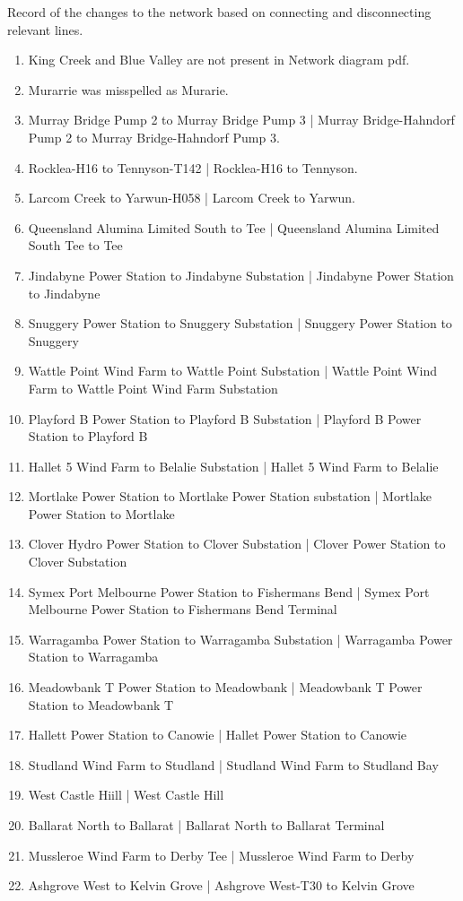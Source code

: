\documentclass{article}
\begin{document}
Record of the changes to the network based on connecting and disconnecting relevant lines.
\begin{enumerate}
\item King Creek and Blue Valley are not present in Network diagram pdf.
\item Murarrie was misspelled as Murarie.
\item Murray Bridge Pump 2 to Murray Bridge Pump 3 | Murray Bridge-Hahndorf Pump 2 to Murray Bridge-Hahndorf Pump 3.
\item Rocklea-H16 to Tennyson-T142 | Rocklea-H16 to Tennyson.
\item Larcom Creek to Yarwun-H058 | Larcom Creek to Yarwun.
\item Queensland Alumina Limited South to Tee | Queensland Alumina Limited South Tee to Tee
\item Jindabyne Power Station to Jindabyne Substation | Jindabyne Power Station to Jindabyne
\item Snuggery Power Station to Snuggery Substation | Snuggery Power Station to Snuggery 
\item Wattle Point Wind Farm to Wattle Point Substation | Wattle Point Wind Farm to Wattle Point Wind Farm Substation
\item Playford B Power Station to Playford B Substation | Playford B Power Station to Playford B
\item Hallet 5 Wind Farm to Belalie Substation | Hallet 5 Wind Farm to Belalie
\item Mortlake Power Station to Mortlake Power Station substation | Mortlake Power Station to Mortlake
\item Clover Hydro Power Station to Clover Substation | Clover Power Station to Clover Substation
\item Symex Port Melbourne Power Station to Fishermans Bend | Symex Port Melbourne Power Station to Fishermans Bend Terminal
\item Warragamba Power Station to Warragamba Substation | Warragamba Power Station to Warragamba
\item Meadowbank T Power Station to Meadowbank | Meadowbank T Power Station to Meadowbank T
\item Hallett Power Station to Canowie | Hallet Power Station to Canowie
\item Studland Wind Farm to Studland | Studland Wind Farm to Studland Bay
\item West Castle Hiill | West Castle Hill
\item Ballarat North to Ballarat | Ballarat North to Ballarat Terminal
\item Mussleroe Wind Farm to Derby Tee | Mussleroe Wind Farm to Derby
\item Ashgrove West to Kelvin Grove | Ashgrove West-T30 to Kelvin Grove
\end{enumerate} 





\end{document}
